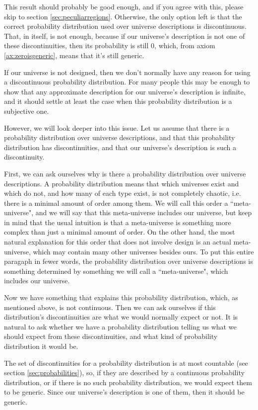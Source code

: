 \documentclass[a4paper
,draft
]{article}
\newcommand{\ghilimele}[1]{``#1"}
\begin{document}
This result should probably be good enough, and if you agree with
this, please skip to section \ref{sec:peculiarregions}.
Otherwise, the only option left is that the correct probability
distribution used over universe descriptions is discontinuous.
That, in itself, is not enough, because if our universe's description is not
one of these discontinuities, then its probability is still $0$, which,
from axiom \ref{ax:zeroisgeneric}, means that it's still generic.

If our universe is not designed, then we don't normally have any
reason for using a discontinuous probability distribution.
For many people this may be enough to
show that any approximate description for our universe's description is
infinite, and it should settle at least the case when this probability
distribution is a subjective one.

However, we will look deeper into this issue.
Let us assume that there is a probability distribution over universe
descriptions, and that this probability distribution has discontinuities,
and that our universe's description is such a discontinuity.

First, we can ask ourselves why is there a probability distribution over
universe descriptions.
A probability distribution means that which universes exist and which do not,
and how many of each type exist, is not completely chaotic,
i.e. there is a minimal amount of order among them.
We will call this order a \ghilimele{meta-universe}, and we will say that
this meta-universe includes our universe, but keep in mind that the usual
intuition is that a meta-universe is something more complex than just
a minimal amount of order.
On the other hand, the most natural explanation for this order
that does not involve design is an actual
meta-universe, which may contain many other universes besides ours.
To put this entire paragaph in fewer words, the probability distribution over
universe descriptions is something determined by something we will call
a \ghilimele{meta-universe}, which includes our universe.

Now we have something that explains this probability distribution, which,
as mentioned above, is not continuous.
Then we can ask ourselves if this distribution's discontinuities are what
we would normally expect or not.
It is natural to ask whether we have a probability distribution telling us
what we should expect from these discontinuities, and what kind of probability
distribution it would be.

The set of discontinuities for a probability distribution is at most countable
(see section \ref{sec:probabilities}), so, if they are described by a
continuous probability
distribution, or if there is no such probability distribution, we would
expect them to be generic.
Since our universe's description is one of them, then it should be generic.
\end{document}
